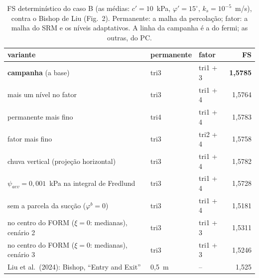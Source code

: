 \begin{table}[htbp]\centering\footnotesize
\caption{FS determinístico do caso B (as médias: $c' = 10$~kPa, $\varphi' = 15^\circ$, $k_s = 10^{-5}$~m/s), contra o Bishop de Liu (Fig.~2). Permanente: a malha da percolação; fator: a malha do SRM e os níveis adaptativos. A linha da campanha é a do fermi; as outras, do PC.}\label{tab:det}
\begin{tabular}{lllr}\toprule
variante & permanente & fator & FS \\\midrule
\textbf{campanha} (a base) & tri3 & tri1 + 3 & \textbf{1{,}5785} \\
mais um nível no fator & tri3 & tri1 + 4 & 1{,}5764 \\
permanente mais fino & tri4 & tri1 + 4 & 1{,}5783 \\
fator mais fino & tri3 & tri2 + 4 & 1{,}5758 \\
chuva vertical (projeção horizontal) & tri3 & tri1 + 4 & 1{,}5782 \\
$\psi_{aev} = 0{,}001$~kPa na integral de Fredlund & tri3 & tri1 + 4 & 1{,}5728 \\
sem a parcela da sucção ($\varphi^b = 0$) & tri3 & tri1 + 4 & 1{,}5181 \\
\midrule
no centro do FORM ($\xi = 0$: medianas), cenário 2 & tri3 & tri1 + 3 & 1{,}5311 \\
no centro do FORM ($\xi = 0$: medianas), cenário 3 & tri3 & tri1 + 3 & 1{,}5246 \\
\midrule Liu et al.\ (2024): Bishop, ``Entry and Exit'' & 0,5~m & -- & 1{,}525 \\
\bottomrule\end{tabular}\end{table}

